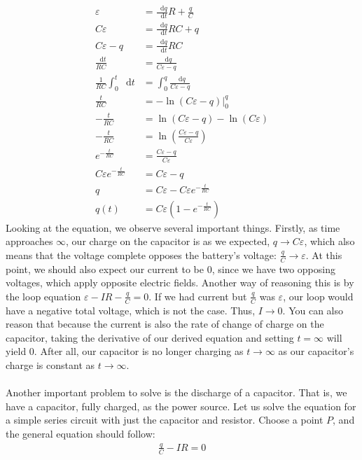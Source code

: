\documentclass{article}
\newcommand*\dif{\mathop{}\!\mathrm{d}}
\begin{document}
\begin{align*}
\varepsilon &= \frac{\dif q}{\dif t}R + \frac{q}{C}\\
C\varepsilon &= \frac{\dif q}{\dif t}RC + q\\
C\varepsilon - q &= \frac{\dif q}{\dif t}RC\\
\frac{\dif t}{RC} &= \frac{\dif q}{C\varepsilon-q} \\
\frac{1}{RC}\int_0^t \dif t &= \int_0^q \frac{\dif q}{C\varepsilon-q}\\
\frac{t}{RC} &= -\ln(C\varepsilon - q)\big|_0^q\\
-\frac{t}{RC} &= \ln(C\varepsilon - q) - \ln(C\varepsilon) \\
-\frac{t}{RC} &= \ln(\frac{C\varepsilon - q}{C\varepsilon}) \\
e^{-\frac{t}{RC}} &= \frac{C\varepsilon - q}{C\varepsilon}\\
C\varepsilon e^{-\frac{t}{RC}} &=C\varepsilon - q\\
q &= C\varepsilon - C\varepsilon e^{-\frac{t}{RC}}\\
q(t) &= C\varepsilon(1 - e^{-\frac{t}{RC}}) 
\end{align*}
Looking at the equation, we observe several important things. Firstly, as time approaches $\infty$, our charge on the capacitor is as we expected, $q \rightarrow C\varepsilon$, which also means that the voltage complete opposes the battery's voltage: $\frac{q}{C} \rightarrow \varepsilon$. At this point, we should also expect our current to be $0$, since we have two opposing voltages, which apply opposite electric fields. Another way of reasoning this is by the loop equation $\varepsilon - IR - \frac{q}{C} = 0$. If we had current but $\frac{q}{C}$ was $\varepsilon$, our loop would have a negative total voltage, which is not the case. Thus, $I \rightarrow 0$. You can also reason that because the current is also the rate of change of charge on the capacitor, taking the derivative of our derived equation and setting $t = \infty$ will yield $0$. After all, our capacitor is no longer charging as $t \rightarrow \infty$ as our capacitor's charge is constant as $t \rightarrow \infty$.\\
\\
Another important problem to solve is the discharge of a capacitor. That is, we have a capacitor, fully charged, as the power source. Let us solve the equation for a simple series circuit with just the capacitor and resistor. Choose a point $P$, and the general equation should follow:
\begin{align*}
\frac{q}{C} - IR = 0
\end{align*}
\end{document}
